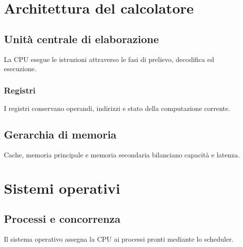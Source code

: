 \documentclass{../../../unipd-notes}
\begin{document}
\makecoursetableofcontents
\makecoursemainmatter

\chapter{Architettura del calcolatore}
\section{Unità centrale di elaborazione}
La CPU esegue le istruzioni attraverso le fasi di prelievo, decodifica ed esecuzione.
\subsection{Registri}
I registri conservano operandi, indirizzi e stato della computazione corrente.
\section{Gerarchia di memoria}
Cache, memoria principale e memoria secondaria bilanciano capacità e latenza.

\chapter{Sistemi operativi}
\section{Processi e concorrenza}
Il sistema operativo assegna la CPU ai processi pronti mediante lo scheduler.
\end{document}
